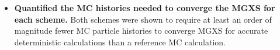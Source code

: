\documentclass[12pt,twoside]{mitthesis-exec}
\begin{document}
\begin{itemize}

\item \textbf{Quantified the MC histories needed to converge the MGXS for each scheme.} Both schemes were shown to require at least an order of magnitude fewer MC particle histories to converge MGXS for accurate deterministic calculations than a reference MC calculation. 


\end{itemize}



\end{document}
